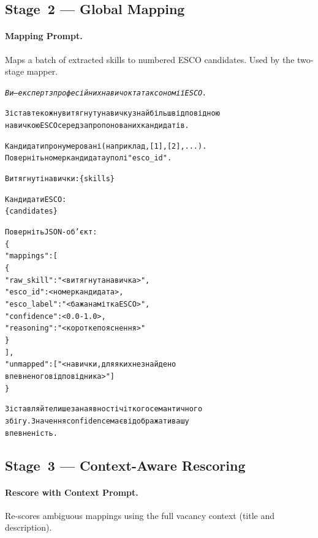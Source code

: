 \documentclass[11pt]{article}
\begin{document}
\subsection{Stage~2 --- Global Mapping}

\paragraph{Mapping Prompt.}
Maps a batch of extracted skills to numbered ESCO candidates. Used by the two-stage mapper.

\begin{small}
\begin{alltt}\selectfont\itshape
Ви — експерт з професійних навичок та таксономії ESCO.

Зіставте кожну витягнуту навичку з найбільш відповідною
навичкою ESCO серед запропонованих кандидатів.

Кандидати пронумеровані (наприклад, [1], [2], ...).
Поверніть номер кандидата у полі "esco\_id".

Витягнуті навички: \{skills\}

Кандидати ESCO:
\{candidates\}

Поверніть JSON-об'єкт:
\{
  "mappings": [
    \{
      "raw\_skill": "<витягнута навичка>",
      "esco\_id": <номер кандидата>,
      "esco\_label": "<бажана мітка ESCO>",
      "confidence": <0.0-1.0>,
      "reasoning": "<коротке пояснення>"
    \}
  ],
  "unmapped": ["<навички, для яких не знайдено
                 впевненого відповідника>"]
\}

Зіставляйте лише за наявності чіткого семантичного
збігу. Значення confidence має відображати вашу
впевненість.
\end{alltt}
\end{small}

\subsection{Stage~3 --- Context-Aware Rescoring}

\paragraph{Rescore with Context Prompt.}
Re-scores ambiguous mappings using the full vacancy context (title and description).
\end{document}

